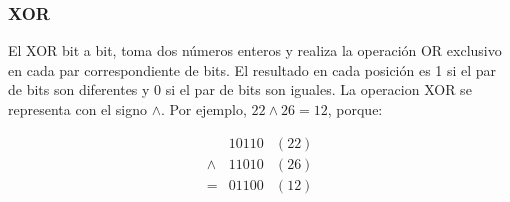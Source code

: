 \subsubsection{XOR}

El XOR bit a bit, toma dos números enteros y realiza la operación OR exclusivo en cada par
 correspondiente de bits. El resultado en cada posición es 1 si el par de bits son diferentes y 0 si el
 par de bits son iguales. La operacion XOR se representa con el signo $\wedge$. Por ejemplo, $22 \wedge 26 = 12$, porque:

$$
\begin{array}{ccc}
		& 10110 & (22) \\
	\wedge	& 11010 & (26) \\
	\hline
	= & 01100 & (12)
\end{array}
$$